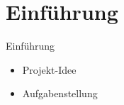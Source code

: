 
\section{Einführung}

\begin{frame}{Einführung}
    \begin{itemize}
        \item Projekt-Idee
        \item Aufgabenstellung
    \end{itemize}
\end{frame}
